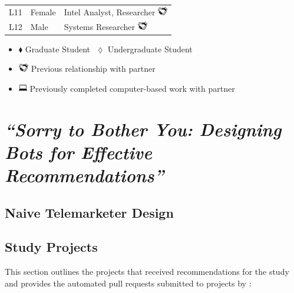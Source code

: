 \begin{table}[H]
\begin{tabular}{lll}
		L11 & Female & Intel Analyst, Researcher \includegraphics[height=1em]{Chapter-3/images/hands.png} \\
		L12 & Male & Systems Researcher \includegraphics[height=1em]{Chapter-3/images/hands.png} \\
	\hline
	\end{tabular}
    {\footnotesize
	\begin{itemize}[topsep=0pt,itemsep=-1ex,partopsep=1ex,parsep=1ex]
	\centering
        \item[] $\blacklozenge$ Graduate Student $     $ $\lozenge$ Undergraduate Student
        \item[] \includegraphics[height=1em]{Chapter-3/images/hands.png} Previous relationship with partner 
        \item[] \includegraphics[height=1em]{Chapter-3/images/computer.png} Previously completed computer-based work with partner
    \end{itemize}
    }
	\label{tab:peer-participants}
\end{table}

\newpage

\section{\em ``Sorry to Bother You: Designing Bots for Effective Recommendations''}

\subsection{Naive Telemarketer Design}
\label{app-sorry}



\subsection{Study Projects}
\label{app-sorry-projects}

This section outlines the projects that received recommendations for the \tele study and provides the automated pull requests submitted to projects by \toolone:

